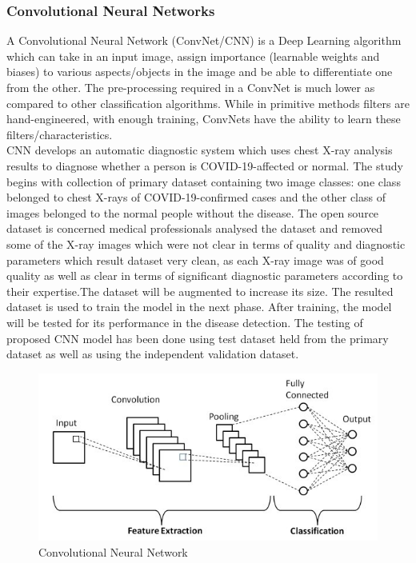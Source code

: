 \documentclass[a4paper,12pt]{report}
\begin{document}
\subsubsection{Convolutional Neural Networks}
A Convolutional Neural Network (ConvNet/CNN) is a Deep Learning algorithm which can
take in an input image, assign importance (learnable weights and biases) to various aspects/objects in the image and be able to differentiate one from the other. The pre-processing
required in a ConvNet is much lower as compared to other classification algorithms. While
in primitive methods filters are hand-engineered, with enough training, ConvNets have the
ability to learn these filters/characteristics.
\\
CNN develops an automatic diagnostic system which uses chest X-ray analysis results to diagnose whether a person is COVID-19-affected or normal. The study begins with collection of primary dataset containing two image classes: one class belonged to chest X-rays of COVID-19-confirmed cases and the other class of images belonged to the normal people without the disease. The open source dataset is concerned medical professionals analysed the dataset and removed some of the X-ray images which were not clear in terms of quality and diagnostic parameters which result dataset very clean, as each X-ray image was of good quality as well as clear in terms of significant diagnostic parameters according to their expertise.The dataset will be augmented to increase its size. The resulted dataset is used to train the model in the next phase. After training, the model will be tested for its performance in the disease detection. The testing of proposed CNN model has been done using test dataset held from the primary dataset as well as using the independent validation dataset.
\begin{figure}[h] %
   \begin{center}
   \includegraphics[scale=0.8]{cnn.jpg}
   \caption{Convolutional Neural Network}
  \end{center}
  \end{figure}
\end{document}
